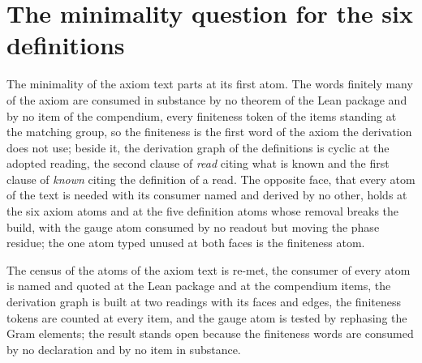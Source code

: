\section{The minimality question for the six definitions}\label{mod:I-1-D535761-w-mnth}
\begin{chwall}\label{box:I-1-D535761-w-mnth:1}
The minimality of the axiom text parts at its first atom. The words finitely many of the axiom are consumed in substance by no theorem of the Lean package and by no item of the compendium, every finiteness token of the items standing at the matching group, so the finiteness is the first word of the axiom the derivation does not use; beside it, the derivation graph of the definitions is cyclic at the adopted reading, the second clause of \emph{read} citing what is known and the first clause of \emph{known} citing the definition of a read. The opposite face, that every atom of the text is needed with its consumer named and derived by no other, holds at the six axiom atoms and at the five definition atoms whose removal breaks the build, with the gauge atom consumed by no readout but moving the phase residue; the one atom typed unused at both faces is the finiteness atom.
\end{chwall}
The census of the atoms of the axiom text is re-met, the consumer of every atom is named and quoted at the Lean package and at the compendium items, the derivation graph is built at two readings with its faces and edges, the finiteness tokens are counted at every item, and the gauge atom is tested by rephasing the Gram elements; the result stands open because the finiteness words are consumed by no declaration and by no item in substance.

